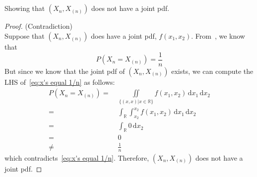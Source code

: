 \documentclass[hwnumber=3,studentnumber=20053722]{mthe353answer}
\begin{document}
\begin{questions}
\begin{parts}
      \part{}
      Showing that \((X_n, X_{(n)})\) does not have a joint pdf.
      \begin{solution}
        \begin{proof}
          (Contradiction)\\
          Suppose that \((X_n, X_{(n)})\) does have a joint pdf, \(f(x_1, x_2)\).
          From~, we know that
          \begin{equation}
            \label{eq:x's equal 1/n}
            P(X_n = X_{(n)}) = \frac{1}{n}
          \end{equation}
          But since we know that the joint pdf of \((X_n, X_{(n)})\) exists, we
          can compute the LHS of~\eqref{eq:x's equal 1/n} as follows:
          \begin{align*}
            P(X_n = X_{(n)}) =&\; \iint\limits_{\{(x, x) | x \in \mathbb{R}\}}
              f(x_1, x_2) \, \textrm{d}x_1 \, \textrm{d}x_2 \\
            =&\; \int_{\mathbb{R}} \int_{x_2}^{x_2} f(x_1, x_2) \, \textrm{d}x_1 \, \textrm{d}x_2\\
            =&\; \int_{\mathbb{R}} 0 \, \textrm{d}x_2\\
            =&\; 0\\
            \neq&\; \frac{1}{n}
          \end{align*}
          which contradicts~\eqref{eq:x's equal 1/n}. Therefore,
          \((X_n, X_{(n)})\) does not have a joint pdf.
        \end{proof}
      \end{solution}
    \end{parts}
  \end{questions}
\end{document}

